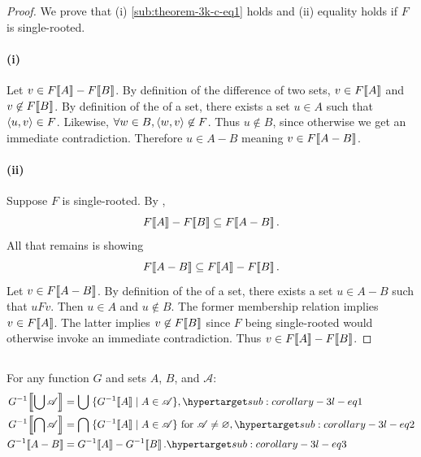 \documentclass{report}
\begin{document}
  \begin{proof}
    We prove that (i) \eqref{sub:theorem-3k-c-eq1} holds and (ii) equality holds
      if $F$ is single-rooted.

    \paragraph{(i)}%

      Let $v \in F\!\left\llbracket A\right\rrbracket - F\!\left\llbracket B\right\rrbracket$.
      By definition of the difference of two sets,
        $v \in F\!\left\llbracket A\right\rrbracket$ and $v \not\in F\!\left\llbracket B\right\rrbracket$.
      By definition of the  of a set, there exists a set
        $u \in A$ such that $\left< u, v \right> \in F$.
      Likewise, $\forall w \in B, \left< w, v \right> \not\in F$.
      Thus $u \not\in B$, since otherwise we get an immediate contradiction.
      Therefore $u \in A - B$ meaning $v \in F\!\left\llbracket A - B\right\rrbracket$.

    \paragraph{(ii)}%

      Suppose $F$ is single-rooted.
      By ,
        $$F\!\left\llbracket A\right\rrbracket - F\!\left\llbracket B\right\rrbracket \subseteq F\!\left\llbracket A - B\right\rrbracket.$$
      All that remains is showing
        $$F\!\left\llbracket A - B\right\rrbracket \subseteq F\!\left\llbracket A\right\rrbracket - F\!\left\llbracket B\right\rrbracket.$$
      Let $v \in F\!\left\llbracket A - B\right\rrbracket$.
      By definition of the  of a set, there exists a set
        $u \in A - B$ such that $uFv$.
      Then $u \in A$ and $u \not\in B$.
      The former membership relation implies $v \in F\!\left\llbracket A\right\rrbracket$.
      The latter implies $v \not\in F\!\left\llbracket B\right\rrbracket$ since $F$ being single-rooted
        would otherwise invoke an immediate contradiction.
      Thus $v \in F\!\left\llbracket A\right\rrbracket - F\!\left\llbracket B\right\rrbracket$.

  \end{proof}

\subsection{}%

  \begin{theorem}[3L]
    For any function $G$ and sets $A$, $B$, and $\mathscr{A}$:
    \begin{align}
      \img{G^{-1}}{\bigcup{\mathscr{A}}}
        & = \bigcup\;\{\img{G^{-1}}{A} \mid A \in \mathscr{A}\},
        \hyperlabel{sub:corollary-3l-eq1} \\
      \img{G^{-1}}{\bigcap{\mathscr{A}}}
        & = \bigcap\;\{\img{G^{-1}}{A} \mid A \in \mathscr{A}\}
        \text{ for } \mathscr{A} \neq \emptyset,
        \hyperlabel{sub:corollary-3l-eq2} \\
      \img{G^{-1}}{A - B} & = \img{G^{-1}}{A} - \img{G^{-1}}{B}.
        \hyperlabel{sub:corollary-3l-eq3}
    \end{align}
  \end{theorem}
\end{document}
